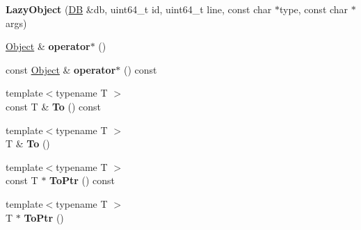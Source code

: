 \begin{DoxyCompactItemize}
\item 
\hypertarget{class_assimp_1_1_s_t_e_p_1_1_lazy_object_aa59de297cd6e48d4387ae54f55038434}{{\bfseries Lazy\+Object} (\hyperlink{class_assimp_1_1_s_t_e_p_1_1_d_b}{D\+B} \&db, uint64\+\_\+t id, uint64\+\_\+t line, const char $\ast$type, const char $\ast$args)}\label{class_assimp_1_1_s_t_e_p_1_1_lazy_object_aa59de297cd6e48d4387ae54f55038434}

\item 
\hypertarget{class_assimp_1_1_s_t_e_p_1_1_lazy_object_a10b3ed4cef98da89ff402f454cc56d8b}{\hyperlink{class_assimp_1_1_s_t_e_p_1_1_object}{Object} \& {\bfseries operator$\ast$} ()}\label{class_assimp_1_1_s_t_e_p_1_1_lazy_object_a10b3ed4cef98da89ff402f454cc56d8b}

\item 
\hypertarget{class_assimp_1_1_s_t_e_p_1_1_lazy_object_afea794f5c34dff1dc1f5c4f341e24115}{const \hyperlink{class_assimp_1_1_s_t_e_p_1_1_object}{Object} \& {\bfseries operator$\ast$} () const }\label{class_assimp_1_1_s_t_e_p_1_1_lazy_object_afea794f5c34dff1dc1f5c4f341e24115}

\item 
\hypertarget{class_assimp_1_1_s_t_e_p_1_1_lazy_object_a0ecf395a4b927064452f9af78eb1be8a}{{\footnotesize template$<$typename T $>$ }\\const T \& {\bfseries To} () const }\label{class_assimp_1_1_s_t_e_p_1_1_lazy_object_a0ecf395a4b927064452f9af78eb1be8a}

\item 
\hypertarget{class_assimp_1_1_s_t_e_p_1_1_lazy_object_ad6b6af910568cf855800d461cdb4f1b2}{{\footnotesize template$<$typename T $>$ }\\T \& {\bfseries To} ()}\label{class_assimp_1_1_s_t_e_p_1_1_lazy_object_ad6b6af910568cf855800d461cdb4f1b2}

\item 
\hypertarget{class_assimp_1_1_s_t_e_p_1_1_lazy_object_a3cfc5d93a58555227678d395ad15f485}{{\footnotesize template$<$typename T $>$ }\\const T $\ast$ {\bfseries To\+Ptr} () const }\label{class_assimp_1_1_s_t_e_p_1_1_lazy_object_a3cfc5d93a58555227678d395ad15f485}

\item 
\hypertarget{class_assimp_1_1_s_t_e_p_1_1_lazy_object_a7cf3b957d2a6b08389b1ebfd6dddc828}{{\footnotesize template$<$typename T $>$ }\\T $\ast$ {\bfseries To\+Ptr} ()}\label{class_assimp_1_1_s_t_e_p_1_1_lazy_object_a7cf3b957d2a6b08389b1ebfd6dddc828}


\end{DoxyCompactItemize}
